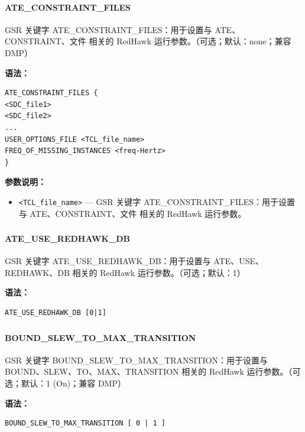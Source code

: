 \paragraph*{ATE_CONSTRAINT_FILES}

GSR 关键字 ATE_CONSTRAINT_FILES：用于设置与 ATE、CONSTRAINT、文件 相关的 RedHawk 运行参数。（可选；默认：none；兼容 DMP）

\textbf{语法：}
\begin{lstlisting}
ATE_CONSTRAINT_FILES {
<SDC_file1>
<SDC_file2>
...
USER_OPTIONS_FILE <TCL_file_name>
FREQ_OF_MISSING_INSTANCES <freq-Hertz>
}
\end{lstlisting}

\textbf{参数说明：}
\begin{itemize}
\item \texttt{<TCL\_file\_name>} — GSR 关键字 ATE\_CONSTRAINT\_FILES：用于设置与 ATE、CONSTRAINT、文件 相关的 RedHawk 运行参数。
\end{itemize}

\subsubsection{}
\paragraph*{ATE_USE_REDHAWK_DB}

GSR 关键字 ATE_USE_REDHAWK_DB：用于设置与 ATE、USE、REDHAWK、DB 相关的 RedHawk 运行参数。（可选；默认：1）

\textbf{语法：}
\begin{lstlisting}
ATE_USE_REDHAWK_DB [0|1]
\end{lstlisting}

\subsubsection{}
\paragraph*{BOUND_SLEW_TO_MAX_TRANSITION}

GSR 关键字 BOUND_SLEW_TO_MAX_TRANSITION：用于设置与 BOUND、SLEW、TO、MAX、TRANSITION 相关的 RedHawk 运行参数。（可选；默认：1 (On)；兼容 DMP）

\textbf{语法：}
\begin{lstlisting}
BOUND_SLEW_TO_MAX_TRANSITION [ 0 | 1 ]
\end{lstlisting}

